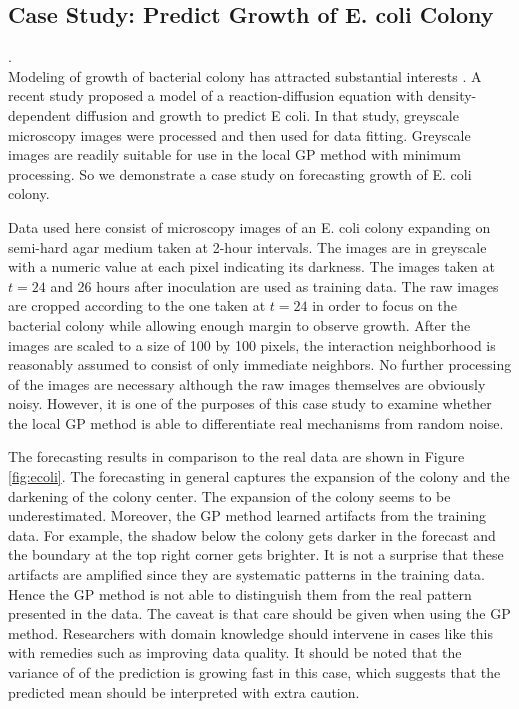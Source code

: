 \documentclass[11pt, reqno]{amsart}
\begin{document}
\subsection{Case Study: Predict Growth of E. coli Colony} .\\
Modeling of growth of bacterial colony has attracted substantial interests \citep{mimura2000reaction,kawasaki1997modeling,leyva2013effects}. A recent study \citep{he2020predictive} proposed a model of a reaction-diffusion equation with density-dependent diffusion and growth to predict E coli. In that study, greyscale microscopy images were processed and then used for data fitting. Greyscale images are readily suitable for use in the local GP method with minimum processing. So we demonstrate a case study on forecasting growth of E. coli colony.

Data used here consist of microscopy images of an E. coli colony expanding on semi-hard agar medium taken at 2-hour intervals. The images are in greyscale with a numeric value at each pixel indicating its darkness. The images taken at $t=24$ and 26 hours after inoculation are used as training data. The raw images are cropped  according to the one taken at $t=24$ in order to focus on the bacterial colony while allowing enough margin to observe growth. After the images are scaled to a size of 100 by 100 pixels, the interaction neighborhood is reasonably assumed to consist of only immediate neighbors. No further processing of the images are necessary although the raw images themselves are obviously noisy. However, it is one of the purposes of this case study to examine whether the local GP method is able to differentiate real mechanisms from random noise.

The forecasting results in comparison to the real data are shown in Figure \ref{fig:ecoli}. The forecasting in general captures the expansion of the colony and the darkening of the colony center. The expansion of the colony seems to be underestimated. Moreover, the GP method learned artifacts from the training data. For example, the shadow below the colony gets darker in the forecast and the boundary at the top right corner gets brighter. It is not a surprise that these artifacts are amplified since they are systematic patterns in the training data. Hence the GP method is not able to distinguish them from the real pattern presented in the data. The caveat is that care should be given when using the GP method. Researchers with domain knowledge should intervene in cases like this with remedies such as improving data quality. It should be noted that the variance of of the prediction is growing fast in this case, which suggests that the predicted mean should be interpreted with extra caution.          
\end{document}
